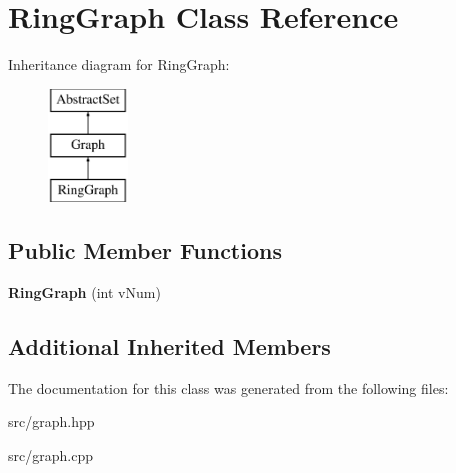 \hypertarget{classRingGraph}{\section{Ring\-Graph Class Reference}
\label{classRingGraph}
}
Inheritance diagram for Ring\-Graph\-:\begin{figure}[H]
\begin{center}
\leavevmode
\includegraphics[height=3.000000cm]{classRingGraph}
\end{center}
\end{figure}
\subsection*{Public Member Functions}
\begin{DoxyCompactItemize}
\item 
\hypertarget{classRingGraph_a352a09a7580038e222dca138aa05a054}{{\bfseries Ring\-Graph} (int v\-Num)}\label{classRingGraph_a352a09a7580038e222dca138aa05a054}

\end{DoxyCompactItemize}
\subsection*{Additional Inherited Members}


The documentation for this class was generated from the following files\-:\begin{DoxyCompactItemize}
\item 
src/graph.\-hpp\item 
src/graph.\-cpp\end{DoxyCompactItemize}
